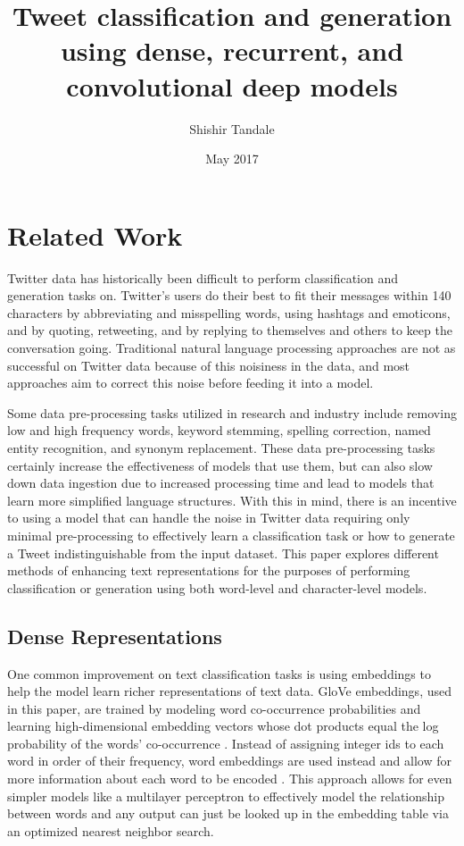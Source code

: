 \documentclass{article}
\title{Tweet classification and generation using dense, recurrent, and convolutional deep models}
\author{Shishir Tandale}
\date{May 2017}
\begin{document}
\maketitle

\section{Related Work}
	Twitter data has historically been difficult to perform classification and generation
	tasks on. Twitter's users do their best to fit their messages within 140 characters
	by abbreviating and misspelling words, using hashtags and emoticons, and by quoting,
	retweeting, and by replying to themselves and others to keep the conversation going.
	Traditional natural language processing approaches are not as successful on Twitter
	data because of this noisiness in the data, and most approaches aim to correct this
	noise before feeding it into a model.

	Some data pre-processing tasks utilized in research and industry include removing
	low and high frequency words, keyword stemming, spelling correction, named entity
	recognition, and synonym replacement. These data pre-processing tasks certainly
	increase the effectiveness of models that use them, but can also slow down data ingestion
	due to increased processing time and lead to models that learn more simplified language
	structures. With this in mind, there is an incentive to using a model that can
	handle the noise in Twitter data requiring only minimal pre-processing to effectively
	learn a classification task or how to generate a Tweet indistinguishable from the input
	dataset. This paper explores different methods of enhancing text representations
	for the purposes of performing classification or generation using both word-level
	and character-level models.

	\subsection{Dense Representations}
		One common improvement on text classification tasks is using embeddings to help the
		model learn richer representations of text data. GloVe embeddings, used in this paper,
		are trained by modeling word co-occurrence probabilities and learning high-dimensional
		embedding vectors whose dot products equal the log probability of the words' co-occurrence
		\parencite{Pennington2014}. Instead of assigning integer ids to each word
		in order of their frequency, word embeddings are used instead and allow for more
		information about each word to be encoded \parencite{Baldi2012}. This approach allows for even simpler models
		like a multilayer perceptron to effectively model the relationship between words
		and any output can just be looked up in the embedding table via an optimized
		nearest neighbor search.
\end{document}
